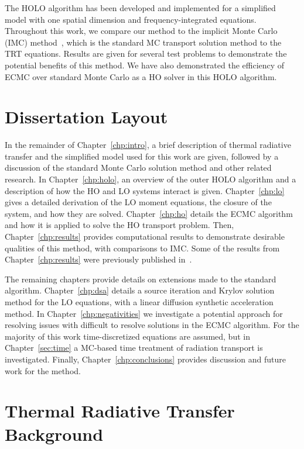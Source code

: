 The HOLO algorithm has been
developed and implemented for a simplified model with one spatial dimension and
frequency-integrated equations. Throughout this work, we compare our
method to the implicit Monte Carlo (IMC) method~\cite{fnc}, which is the standard MC
transport solution method to the TRT equations.  Results are given for several test
problems to demonstrate the potential benefits of this method.  We have also demonstrated the efficiency of ECMC over standard Monte Carlo
as a HO solver in this HOLO algorithm.

\section{Dissertation Layout}


In the remainder of Chapter~\ref{chp:intro},  a brief description of thermal radiative transfer and the simplified model used
 for this work are given, followed by a discussion of the standard Monte Carlo
solution method and other related research.  
In Chapter~\ref{chp:holo}, an overview of the outer HOLO algorithm and a description of
how the HO and LO systems interact is given.
Chapter~\ref{chp:lo} gives a detailed derivation of the LO moment
equations, the closure of the system, and how they are solved. 
Chapter~\ref{chp:ho} details the ECMC algorithm and how it is applied to solve the HO transport problem.
Then, Chapter~\ref{chp:results} provides computational results to demonstrate desirable
qualities of this method, with comparisons to IMC.  Some of the results from
Chapter~\ref{chp:results} were previously published
in~\cite{bolding_nse}.

The remaining chapters provide details on extensions made to the standard algorithm.
Chapter~\ref{chp:dsa} details a source iteration and Krylov solution method for the LO
equations, with a linear diffusion synthetic acceleration method.  In
Chapter~\ref{chp:negativities} we investigate a potential approach for resolving issues
with difficult to resolve solutions in the ECMC algorithm.
For the majority of this work time-discretized equations are assumed, but in
Chapter~\ref{sec:time} a MC-based time treatment of radiation transport is investigated.
Finally, Chapter~\ref{chp:conclusions} provides discussion and future work for the method.

\section{Thermal Radiative Transfer Background}

